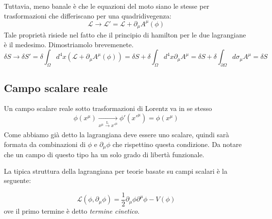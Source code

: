 Tuttavia, meno banale è che le equazioni del moto siano le stesse per trasformazioni che differiscano per una quadridivegenza:
\begin{equation}
  \mathcal{L}\xrightarrow[\text{}]{\text{}}\mathcal{L}'=\mathcal{L}+\partial_\mu A^\mu(\phi)
\end{equation}
Tale proprietà risiede nel fatto che il principio di hamilton per le due lagrangiane è il medesimo. Dimostriamolo brevemenete.
\begin{equation}
 \delta S\xrightarrow[\text{}]{\text{}}\delta S'=\delta\int_{\Omega }d^4x\left(\mathcal{L}+\partial_\mu A^\mu(\phi)\right)=\delta S+\delta\int_{\Omega }d^4x\partial_\mu A^\mu=\delta S+\delta\int_{\partial\Omega }d\sigma_\mu A^\mu=\delta S
\end{equation}


\subsection{Campo scalare reale}
Un campo scalare reale sotto trasformazioni di Lorentz va in se stesso
\begin{equation}
 \phi(x^\mu)\xrightarrow[\text{$x^\mu\xrightarrow[\text{}]{\text{L}}x'^{\mu}$}]{\text{}}\phi'(x'^{\mu})=\phi(x^\mu)
\end{equation}
Come abbiamo già detto la lagrangiana deve essere uno scalare, quindi sarà formata da combinazioni di $\phi$ e $\partial_\mu\phi$ che rispettino questa condizione. Da notare che un campo di questo tipo ha un solo grado di libertà funzionale.

La tipica struttura della lagrangiana per teorie basate su campi scalari è la seguente:

\begin{equation}
  \mathcal{L}(\phi,\partial_\mu\phi)=\dfrac{1}{2}\partial_\mu\phi\partial^\mu\phi-V(\phi)
\end{equation}
ove il primo termine è detto \textit{termine cinetico}.

